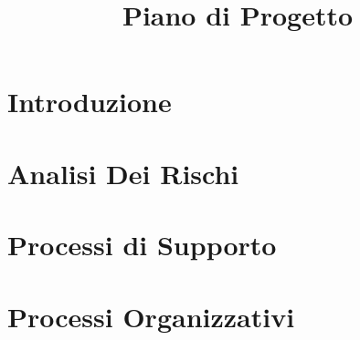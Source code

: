 \documentclass{classes/base}
\title{Piano di Progetto}
\author{\ruth}
\begin{document}
	\maketitle
	\newpage
	\tableofcontents
	
	\newpage
	\section{Introduzione}
	
	
    \newpage
	\section{Analisi Dei Rischi}
	
	
	\newpage
	\section{Processi di Supporto}
	
	
	\newpage
	\section{Processi Organizzativi}
	
	
\end{document}
